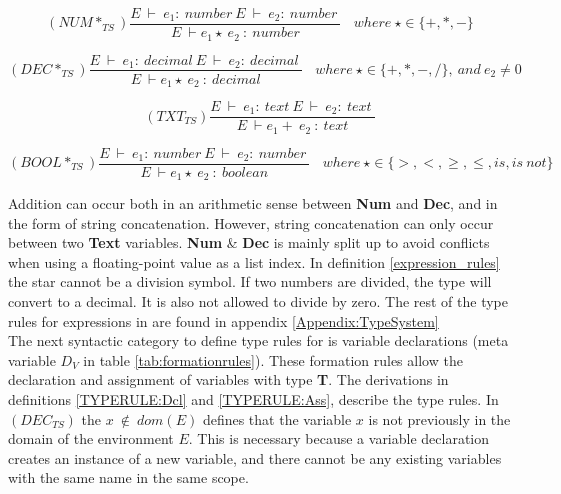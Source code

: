 \begin{equation} \label{expression_rules}
  (NUM*_{TS})\frac{E \ \vdash \ e_1 : \ number \ E \ \vdash \ e_2 : \ number \ }{E \ \vdash e_1 \star \ e_2 \ : \ number} \ \ \ \
  where \ \star \in \{ +, *, - \}  
\end{equation}
    
\begin{equation} \label{Dec*_ts}
    (DEC*_{TS})\frac{E \ \vdash \ e_1 : \ decimal \ E \ \vdash \ e_2 : \ decimal \ }{E \ \vdash e_1 \star \ e_2 \ : \ decimal} \ \ \ \
    where \ \star \in \{ +, *, - , /\},\ and\ e_2 \neq 0
\end{equation}
    
\begin{equation} \label{TXTts}
        (TXT_{TS})\frac{E \ \vdash \ e_1 : \ text \ E \ \vdash \ e_2 : \ text \ }{E \ \vdash e_1 + \ e_2 \ : \ text} 
\end{equation}

\begin{equation} \label{Bool*_ts}
    (BOOL*_{TS})\frac{E \ \vdash \ e_1 : \ number \ E \ \vdash \ e_2 : \ number \ }{E \ \vdash e_1 \star \ e_2 \ : \ boolean} \ \ \ \
    where \ \star \in \{ >, <, \geq, \leq, is, is \ not \}
\end{equation}

\noindent Addition can occur both in an arithmetic sense between \textbf{Num} and \textbf{Dec}, and in the form of string concatenation. However, string concatenation can only occur between two \textbf{Text} variables.  \textbf{Num} \& \textbf{Dec} is mainly split up to avoid conflicts when using a floating-point value as a list index. In definition \ref{expression_rules} the star cannot be a division symbol. If two numbers are divided, the type will convert to a decimal. It is also not allowed to divide by zero. The rest of the type rules for expressions in \lang are found in appendix \ref{Appendix:TypeSystem} \\

The next syntactic category to define type rules for is variable declarations (meta variable $D_V$ in table \ref{tab:formationrules}). These formation rules allow the declaration and assignment of variables with type \textbf{T}. The derivations in definitions \ref{TYPERULE:Dcl} and \ref{TYPERULE:Ass}, describe the type rules. In $(DEC_{TS})$ the $x \ \notin \ dom(E)$ defines that the variable $x$ is not previously in the domain of the environment $E$. This is necessary because a variable declaration creates an instance of a new variable, and there cannot be any existing variables with the same name in the same scope. 

